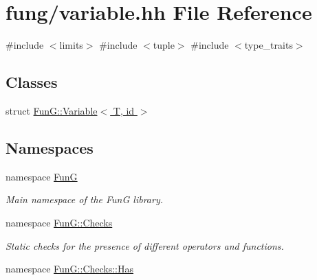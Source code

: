 \hypertarget{variable_8hh}{\section{fung/variable.hh \-File \-Reference}
\label{variable_8hh}
}
{\ttfamily \#include $<$limits$>$}\*
{\ttfamily \#include $<$tuple$>$}\*
{\ttfamily \#include $<$type\-\_\-traits$>$}\*
\subsection*{\-Classes}
\begin{DoxyCompactItemize}
\item 
struct \hyperlink{structFunG_1_1Variable}{\-Fun\-G\-::\-Variable$<$ T, id $>$}
\end{DoxyCompactItemize}
\subsection*{\-Namespaces}
\begin{DoxyCompactItemize}
\item 
namespace \hyperlink{namespaceFunG}{\-Fun\-G}
\begin{DoxyCompactList}\small\item\em \-Main namespace of the \-Fun\-G library. \end{DoxyCompactList}\item 
namespace \hyperlink{namespaceFunG_1_1Checks}{\-Fun\-G\-::\-Checks}
\begin{DoxyCompactList}\small\item\em \-Static checks for the presence of different operators and functions. \end{DoxyCompactList}\item 
namespace \hyperlink{namespaceFunG_1_1Checks_1_1Has}{\-Fun\-G\-::\-Checks\-::\-Has}
\end{DoxyCompactItemize}
